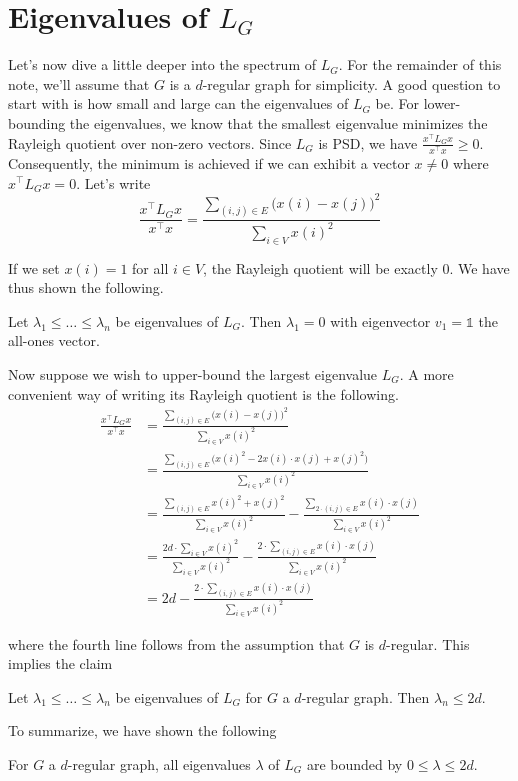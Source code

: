 
\section{Eigenvalues of $L_G$}

Let's now dive a little deeper into the spectrum of $L_G$. For the remainder of this note, we'll assume that $G$ is a $d$-regular graph for simplicity. A good question to start with is how small and large can the eigenvalues of $L_G$ be. For lower-bounding the eigenvalues, we know that the smallest eigenvalue minimizes the Rayleigh quotient over non-zero vectors. Since $L_G$ is PSD, we have $\frac{x^\top L_G x}{x^\top x} \geq 0$. Consequently, the minimum is achieved if we can exhibit a vector $x \neq 0$ where $x^\top L_G x = 0$. Let's write
\begin{equation*}
\frac{x^\top L_G x}{x^\top x}
= \frac{\sum_{(i, j) \in E} \big( x(i) - x(j) \big)^2 }{\sum_{i \in V} x(i)^2}
\end{equation*}

If we set $x(i) = 1$ for all $i \in V$, the Rayleigh quotient will be exactly 0. We have thus shown the following.
\begin{claim}\label{claim:smallest-eigenvalue}
Let $\lambda_1 \leq \ldots \leq \lambda_n$ be eigenvalues of $L_G$. Then $\lambda_1 = 0$ with eigenvector $v_1 = \mathbb{1}$ the all-ones vector.
\end{claim}

Now suppose we wish to upper-bound the largest eigenvalue $L_G$. A more convenient way of writing its Rayleigh quotient is the following.
\begin{align*}
\frac{x^\top L_G x}{x^\top x}
&= \frac{\sum_{(i, j) \in E} \big( x(i) - x(j) \big)^2 }{\sum_{i \in V} x(i)^2} \\
&= \frac{\sum_{(i, j) \in E} \big( x(i)^2 - 2 x(i) \cdot x(j) + x(j)^2 \big) }{\sum_{i \in V} x(i)^2} \\
&= \frac{\sum_{(i, j) \in E} x(i)^2 + x(j)^2}{\sum_{i \in V} x(i)^2} - \frac{\sum_{2 \cdot (i, j) \in E} x(i) \cdot x(j) }{\sum_{i \in V} x(i)^2} \\
&= \frac{2d \cdot \sum_{i \in V} x(i)^2}{\sum_{i \in V} x(i)^2} - \frac{2 \cdot \sum_{(i, j) \in E} x(i) \cdot x(j) }{\sum_{i \in V} x(i)^2} \\
&= 2d - \frac{2 \cdot \sum_{(i, j) \in E} x(i) \cdot x(j) }{\sum_{i \in V} x(i)^2}
\end{align*}

where the fourth line follows from the assumption that $G$ is $d$-regular. This implies the claim

\begin{claim}
Let $\lambda_1 \leq \ldots \leq \lambda_n$ be eigenvalues of $L_G$ for $G$ a $d$-regular graph. Then $\lambda_n \leq 2d$.
\end{claim}

To summarize, we have shown the following

\begin{claim}
For $G$ a $d$-regular graph, all eigenvalues $\lambda$ of $L_G$ are bounded by $0 \leq \lambda \leq 2d$. 
\end{claim}